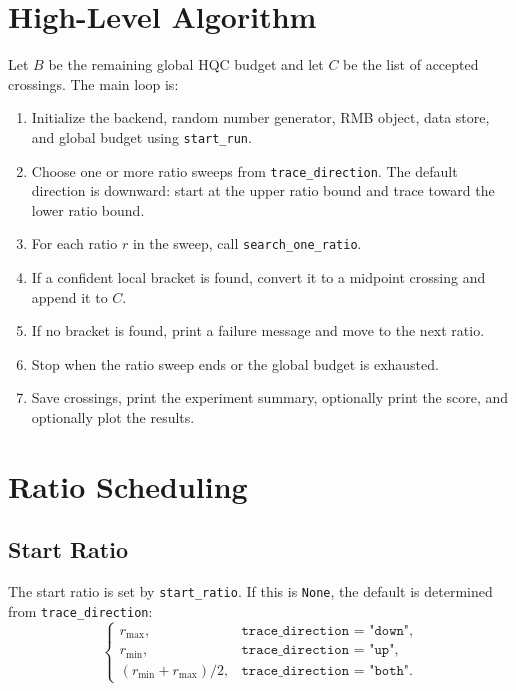 \documentclass[11pt]{article}
\begin{document}
\section{High-Level Algorithm}

Let $B$ be the remaining global HQC budget and let $C$ be the list of accepted
crossings. The main loop is:

\begin{enumerate}[leftmargin=*]
    \item Initialize the backend, random number generator, RMB object, data
    store, and global budget using \texttt{start\_run}.
    \item Choose one or more ratio sweeps from \texttt{trace\_direction}.
    The default direction is downward: start at the upper ratio bound and trace
    toward the lower ratio bound.
    \item For each ratio $r$ in the sweep, call \texttt{search\_one\_ratio}.
    \item If a confident local bracket is found, convert it to a midpoint
    crossing and append it to $C$.
    \item If no bracket is found, print a failure message and move to the next
    ratio.
    \item Stop when the ratio sweep ends or the global budget is exhausted.
    \item Save crossings, print the experiment summary, optionally print the
    score, and optionally plot the results.
\end{enumerate}

\section{Ratio Scheduling}

\subsection{Start Ratio}

The start ratio is set by \texttt{start\_ratio}. If this is \texttt{None}, the
default is determined from \texttt{trace\_direction}:
\[
\begin{cases}
    r_{\max}, & \texttt{trace\_direction = "down"},\\
    r_{\min}, & \texttt{trace\_direction = "up"},\\
    (r_{\min} + r_{\max}) / 2, & \texttt{trace\_direction = "both"}.
\end{cases}
\]
\end{document}
